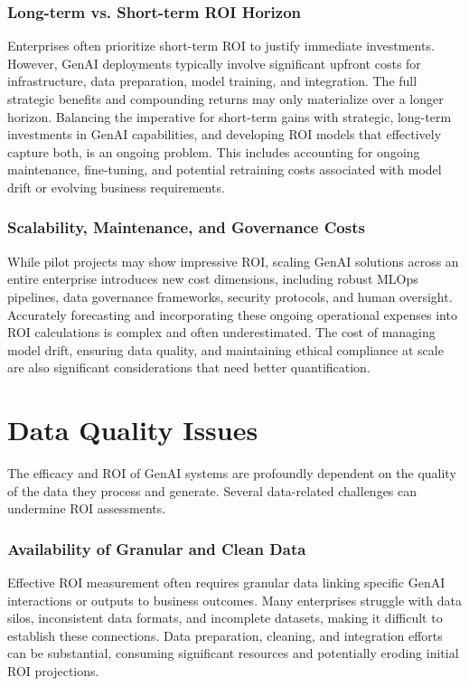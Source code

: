 \documentclass[10pt,twocolumn,letterpaper]{article}
\begin{document}
\subsubsection{Long-term vs. Short-term ROI Horizon}

Enterprises often prioritize short-term ROI to justify immediate investments. However, GenAI deployments typically involve significant upfront costs for infrastructure, data preparation, model training, and integration. The full strategic benefits and compounding returns may only materialize over a longer horizon. Balancing the imperative for short-term gains with strategic, long-term investments in GenAI capabilities, and developing ROI models that effectively capture both, is an ongoing problem. This includes accounting for ongoing maintenance, fine-tuning, and potential retraining costs associated with model drift or evolving business requirements.


\subsubsection{Scalability, Maintenance, and Governance Costs}

While pilot projects may show impressive ROI, scaling GenAI solutions across an entire enterprise introduces new cost dimensions, including robust MLOps pipelines, data governance frameworks, security protocols, and human oversight. Accurately forecasting and incorporating these ongoing operational expenses into ROI calculations is complex and often underestimated. The cost of managing model drift, ensuring data quality, and maintaining ethical compliance at scale are also significant considerations that need better quantification.


\section{Data Quality Issues}


The efficacy and ROI of GenAI systems are profoundly dependent on the quality of the data they process and generate. Several data-related challenges can undermine ROI assessments.


\subsubsection{Availability of Granular and Clean Data}

Effective ROI measurement often requires granular data linking specific GenAI interactions or outputs to business outcomes. Many enterprises struggle with data silos, inconsistent data formats, and incomplete datasets, making it difficult to establish these connections. Data preparation, cleaning, and integration efforts can be substantial, consuming significant resources and potentially eroding initial ROI projections.
\end{document}

